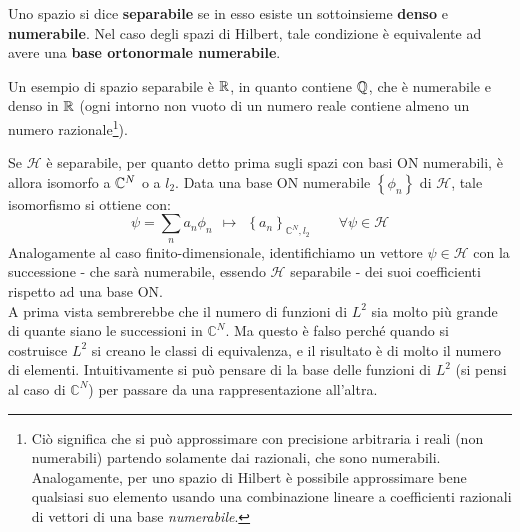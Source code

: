 \documentclass[FisicaTeorica.tex]{subfiles}
\begin{document}
\begin{dfn}
Uno spazio si dice \textbf{separabile}  se in esso esiste un sottoinsieme \textbf{denso} e \textbf{numerabile}. Nel caso degli spazi di Hilbert, tale condizione è equivalente ad avere una \textbf{base ortonormale numerabile}.\\
\end{dfn}
\begin{expl}
Un esempio di spazio separabile è $\mathbb{R}$, in quanto contiene $\mathbb{Q}$, che è numerabile e denso in $\mathbb{R}$ (ogni intorno non vuoto di un numero reale contiene almeno un numero razionale\footnote{Ciò significa che si può approssimare con precisione arbitraria i reali (non numerabili) partendo solamente dai razionali, che sono numerabili. Analogamente, per uno spazio di Hilbert è possibile approssimare bene qualsiasi suo elemento usando una combinazione lineare a coefficienti razionali di vettori di una base \textit{numerabile}.}).
\end{expl}
Se $\mathcal{H}$ è separabile, per quanto detto prima sugli spazi con basi ON numerabili, è allora isomorfo a $\mathbb{C}^N$ o a $l_2$.  Data una base ON numerabile $\left\{\phi_n\right\}$ di $\mathcal{H}$, tale isomorfismo si ottiene con:
\[
\psi = \sum_{n}{a_n\phi_n} \ \ \mapsto \ \ \left\{a_n\right\}_{\mathbb{C}^N,l_2} \qquad \forall \psi \in \mathcal{H}
\]
Analogamente al caso finito-dimensionale, identifichiamo un vettore $\psi \in \mathcal{H}$ con la successione - che sarà numerabile, essendo $\mathcal{H}$ separabile - dei suoi coefficienti rispetto ad una base ON.\\

A prima vista sembrerebbe che il numero di funzioni di $L^2$ sia molto più grande di quante siano le successioni in ${\mathbb C^N}$. Ma questo è falso perché quando si costruisce $L^2$ si creano le classi di equivalenza, e il risultato è  di molto il numero di elementi. Intuitivamente si può pensare di  la base delle funzioni di $L^2$ (si pensi al caso di ${\mathbb C}^N$) per passare da una rappresentazione all'altra. \\
\end{document}
